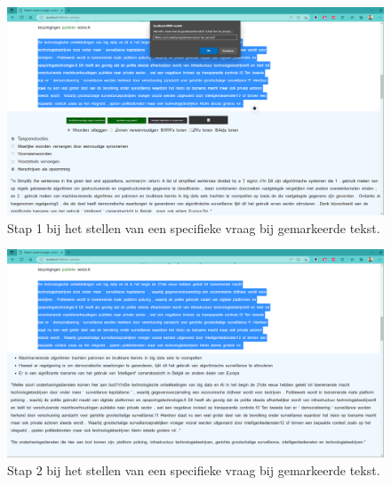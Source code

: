 \begin{center}
	\begin{figure}
		\includegraphics[width=\linewidth]{img/proto-vraagstelling-1.png}
		\caption{Stap 1 bij het stellen van een specifieke vraag bij gemarkeerde tekst.}
		\label{img:step-1-proto-vraagstelling}
	\end{figure}
\end{center}

\begin{center}
	\begin{figure}
		\includegraphics[width=\linewidth]{img/proto-vraagstelling-2.png}
		\caption{Stap 2 bij het stellen van een specifieke vraag bij gemarkeerde tekst.}
		\label{img:step-2-proto-vraagstelling}
	\end{figure}
\end{center}